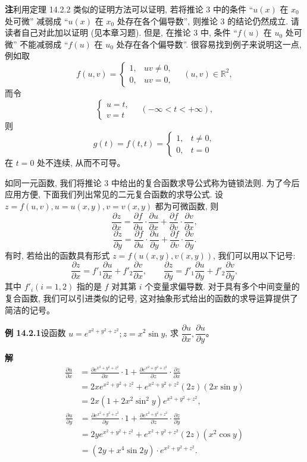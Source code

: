 \documentclass[UTF8,12pt,a4paper,fontset=fandol]{ctexart}
\begin{document}
\noindent\textbf{注}\quad 利用定理 14.2.2 类似的证明方法可以证明, 若将推论 3 中的条件 ``$u(x)$ 在 $x_0$ 处可微'' 减弱成 ``$u(x)$ 在 $x_0$ 处存在各个偏导数'', 则推论 3 的结论仍然成立. 请读者自己对此加以证明 (见本章习题). 但是, 在推论 3 中, 条件 ``$f(u)$ 在 $u_0$ 处可微'' 不能减弱成 ``$f(u)$ 在 $u_0$ 处存在各个偏导数''. 很容易找到例子来说明这一点, 例如取
\[
  f(u,v)=
  \begin{cases}
    1, &uv\ne0,\\
    0, &uv=0,
  \end{cases}
  \quad (u,v)\in\mathbb R^2,
\]
而令
\[
  \begin{cases}
    u=t,\\
    v=t
  \end{cases}
  \quad(-\infty<t<+\infty),
\]
则
\[
  g(t)=f(t,t)=
  \begin{cases}
    1, &t\ne0,\\
    0, &t=0
  \end{cases}
\]
在 $t=0$ 处不连续, 从而不可导。

如同一元函数, 我们将推论 3 中给出的复合函数求导公式称为链锁法则. 为了今后应用方便, 下面我们列出常见的二元复合函数的求导公式. 设 $z=f(u,v), u=u(x,y), v=v(x,y)$ 都为可微函数, 则
\[
  \frac{\partial z}{\partial x}
  =\frac{\partial f}{\partial u}\cdot\frac{\partial u}{\partial x}
  +\frac{\partial f}{\partial v}\cdot\frac{\partial v}{\partial x},
\]
\[
  \frac{\partial z}{\partial y}
  =\frac{\partial f}{\partial u}\cdot\frac{\partial u}{\partial y}
  +\frac{\partial f}{\partial v}\cdot\frac{\partial v}{\partial y}.
\]
有时, 若给出的函数具有形式 $z=f(u(x,y),v(x,y))$, 我们可以用以下记号:
\[
  \frac{\partial z}{\partial x}=f'_1\frac{\partial u}{\partial x}+f'_2\frac{\partial v}{\partial x},
  \qquad
  \frac{\partial z}{\partial y}=f'_1\frac{\partial u}{\partial y}+f'_2\frac{\partial v}{\partial y},
\]
其中 $f'_i(i=1,2)$ 指的是 $f$ 对其第 $i$ 个变量求偏导数. 对于具有多个中间变量的复合函数, 我们可以引进类似的记号, 这对抽象形式给出的函数的求导运算提供了简洁的记号。

\noindent\textbf{例 14.2.1}\quad 设函数 $u=e^{x^2+y^2+z^2}; z=x^2\sin y$, 求 $\dfrac{\partial u}{\partial x}, \dfrac{\partial u}{\partial y}$。

\noindent\textbf{解}\quad
\[
\begin{aligned}
  \frac{\partial u}{\partial x}
  &=\frac{\partial e^{x^2+y^2+z^2}}{\partial x}\cdot1
  +\frac{\partial e^{x^2+y^2+z^2}}{\partial z}\cdot\frac{\partial z}{\partial x}\\
  &=2xe^{x^2+y^2+z^2}+e^{x^2+y^2+z^2}(2z)(2x\sin y)\\
  &=2x(1+2x^2\sin^2 y)e^{x^2+y^2+z^2},
\end{aligned}
\]
\[
\begin{aligned}
  \frac{\partial u}{\partial y}
  &=\frac{\partial e^{x^2+y^2+z^2}}{\partial y}\cdot1
  +\frac{\partial e^{x^2+y^2+z^2}}{\partial z}\cdot\frac{\partial z}{\partial y}\\
  &=2ye^{x^2+y^2+z^2}+e^{x^2+y^2+z^2}(2z)(x^2\cos y)\\
  &=(2y+x^4\sin2y)\cdot e^{x^2+y^2+z^2}.
\end{aligned}
\]
\end{document}
